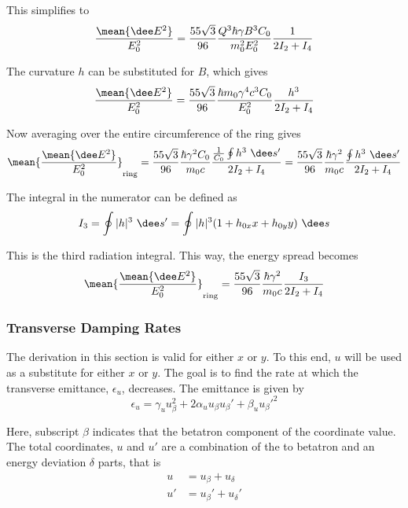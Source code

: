 This simplifies to
\begin{equation}
    \frac{\mean{\dee E^2}}{E_0^2} = \frac{55 \sqrt{3}}{96} \frac{Q^3 \hbar \gamma B^3 C_0}{m_0^2 E_0^2} \frac{1}{2I_2 + I_4}
\end{equation}

The curvature $h$ can be substituted for $B$, which gives
\begin{equation}
    \frac{\mean{\dee E^2}}{E_0^2} = \frac{55 \sqrt{3}}{96}
    \frac{\hbar m_0 \gamma^4 c^3 C_0}{E_0^2} \frac{h^3}{2I_2 + I_4}
    \label{eq:meanenergydeviation}
\end{equation}

Now averaging over the entire circumference of the ring gives
\begin{equation}
    \mean{\frac{\mean{\dee E^2}}{E_0^2}}_\text{ring} = \frac{55 \sqrt{3}}{96} \frac{\hbar \gamma^2 C_0}{m_0 c} \frac{\frac{1}{C_0}\oint h^3 \ \dee s'}{2I_2 + I_4} = \frac{55 \sqrt{3}}{96} \frac{\hbar \gamma^2}{m_0 c} \frac{\oint h^3 \ \dee s'}{2I_2 + I_4}
\end{equation}

The integral in the numerator can be defined as
\begin{equation}
    I_3 = \oint |h|^3 \ \dee s' = \oint |h|^3 (1 + h_{0x} x + h_{0y}y) \ \dee s
\end{equation}

This is the third radiation integral. This way, the energy spread becomes
\begin{equation}
\mean{\frac{\mean{\dee E^2}}{E_0^2}}_\text{ring} = \frac{55 \sqrt{3}}{96} \frac{\hbar \gamma^2}{m_0 c} \frac{I_3}{2I_2 + I_4}
\end{equation}

\subsubsection{Transverse Damping Rates}
\label{sec:transversedamping}

The derivation in this section is valid for either $x$ or $y$. To this end, $u$ will be used as a substitute for either $x$ or $y$. The goal is to find the rate at which the transverse emittance, $\epsilon_u$, decreases. The emittance is given by
\begin{equation}
    \epsilon_u = \gamma_u u_\beta^2 + 2 \alpha_u u_\beta u_\beta' + \beta_u u_\beta'^2
    \label{eq:emittanceu}
\end{equation}

Here, subscript $\beta$ indicates that the betatron component of the coordinate value. The total coordinates, $u$ and $u'$ are a combination of the to betatron and an energy deviation $\delta$ parts, that is
\begin{align}
    u  &= u_\beta  + u_\delta\\
    u' &= u_\beta' + u_\delta'
\end{align}


